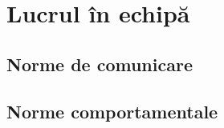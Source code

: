 
\section{Lucrul în echipă}
% 
% 
% 



\subsection{Norme de comunicare}

\subsection{Norme comportamentale}


